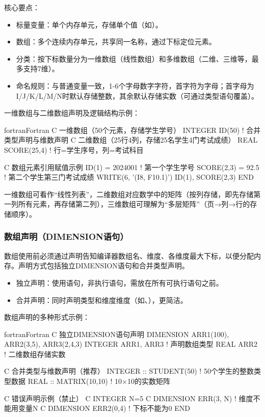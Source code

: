 核心要点：
\begin{itemize}
      \item 标量变量：单个内存单元，存储单个值（如）。
      \item 数组：多个连续内存单元，共享同一名称，通过下标定位元素。
      \item 分类：按下标数量分为一维数组（线性数组）和多维数组（二维、三维等，最多支持7维）。
      \item 命名规则：与普通变量一致，1-6个字母数字字符，首字符为字母；首字母为I/J/K/L/M/N时默认存储整数，其余默认存储实数（可通过类型语句覆盖）。
\end{itemize}

一维数组与二维数组声明及逻辑结构示例：
\begin{envcode}{fortran}{Fortran}
C 一维数组（50个元素，存储学生学号）
      INTEGER ID(50)  ! 合并类型声明与维数声明
C 二维数组（25行4列，存储25名学生4门考试成绩）
      REAL SCORE(25,4)  ! 行=学生序号，列=考试科目
      
C 数组元素引用赋值示例
      ID(1) = 2024001  ! 第一个学生学号
      SCORE(2,3) = 92.5  ! 第二个学生第三门考试成绩
      WRITE(6, '(I8, F10.1)') ID(1), SCORE(2,3)
      END
\end{envcode}

一维数组可看作“线性列表”，二维数组对应数学中的矩阵（按列存储，即先存储第一列所有元素，再存储第二列），三维数组可理解为“多层矩阵”（页→列→行的存储顺序）。

\subsubsection{数组声明（DIMENSION语句）}
数组使用前必须通过声明告知编译器数组名、维度、各维度最大下标，以便分配内存。声明方式包括独立DIMENSION语句和合并类型声明。

\begin{itemize}
      \item 独立声明：使用语句，非执行语句，需放在所有可执行语句之前。
      \item 合并声明：同时声明类型和维度维度（如、），更简洁。
\end{itemize}

数组声明的多种形式示例：
\begin{envcode}{fortran}{Fortran}
C 独立DIMENSION语句声明
      DIMENSION ARR1(100), ARR2(3,5), ARR3(2,4,3)
      INTEGER ARR1, ARR3  ! 声明数组类型
      REAL ARR2           ! 二维数组存储实数
      
C 合并类型与维数声明（推荐）
      INTEGER :: STUDENT(50)  ! 50个学生的整数类型数据
      REAL :: MATRIX(10,10)   ! 10×10的实数矩阵
      
C 错误声明示例（禁止）
C     INTEGER N=5
C     DIMENSION ERR(3, N)  ! 维度不能用变量N
C     DIMENSION ERR2(0,4)  ! 下标不能为0
      END
\end{envcode}

